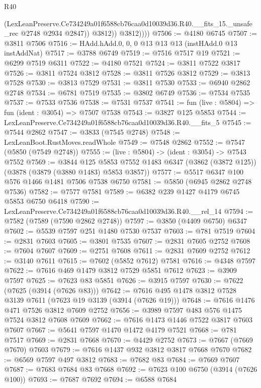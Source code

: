 \begin{lexlean}{R40}
\begin{coremodule}
                  (LexLeanPreserve.Ce734249a01f6588cb76caa0d10039d36.R40.__fits_15._unsafe_rec
                    @2748
                    @2934
                    @2847))
                @3812))
            @3812))))
@7506 := @4180 @6745
@7507 := @3811 @7506
@7516 := HAdd.hAdd.{0, 0, 0} @13 @13 @13 (instHAdd.{0} @13 instAddNat)
@7517 := @3788 @6749
@7519 := @7516 @7517 @19
@7521 := @6299 @7519 @6311
@7522 := @4180 @7521
@7524 := @3811 @7522 @3817
@7526 := @3811 @7524 @3812
@7528 := @3811 @7526 @3812
@7529 := @3813 @7528
@7530 := @3813 @7529
@7531 := @3811 @7530
@7533 := @6940 @2862 @2748
@7534 := @6781 @7519
@7535 := @3802 @6749
@7536 := @7534 @7535
@7537 := @7533 @7536
@7538 := @7531 @7537
@7541 := fun (live : @5804) => fun (ident : @3054) => @7507 @7538
@7543 := @3827 @125 @5853
@7544 := LexLeanPreserve.Ce734249a01f6588cb76caa0d10039d36.R40.__fits_5
@7545 := @7544 @2862
@7547 := @3833 (@7545 @2748)
@7548 := LexLeanBoot.RustMoves.readWhole
@7549 := @7548 @2862
@7552 := @7547 (@5850 (@7549 @2748))
@7555 := (live : @5804) -> (ident : @3054) -> @7543 @7552
@7569 := @3844
    @125
    @5853
    @7552
    @1483
    @6347
    (@3862 (@3872 @125))
    (@3878 (@3879 (@3880 @1483) @5853 @3857))
@7577 := @5517 @6347 @100 @576 @1466 @1481 @7506 @7538 @6750
@7581 := @5850 (@6945 @2862 @2748 @7536)
@7582 := @7577 @7581
@7589 := @6382 @239 @1427 @4179 @6745 @5853 @6750 @6418
@7590 := LexLeanPreserve.Ce734249a01f6588cb76caa0d10039d36.R40.__rel_14
@7594 := @7582 (@7589 (@7590 @2862 @2748))
@7597 := @3850 (@4409 @6750) @6347
@7602 := @5539 @7597 @251 @1480 @7530 @7537
@7603 := @781 @7519
@7604 := @2831 @7603
@7605 := @3801 @7535
@7607 := @2831 @7605 @2752
@7608 := @7604 @7607
@7609 := @2751 @7608
@7611 := @2831 @7609 @2752
@7612 := @3140 @7611
@7615 := @7602 (@5852 @7612) @7581
@7616 := @4348 @7597
@7622 := @7616 @469 @1479 @3812 @7529 @5851 @7612
@7623 := @3909 @7597
@7625 := @7623 @83 @5851
@7626 := @3915 @7597
@7630 := @7622 (@7625 (@3914 (@7626 @83)))
@7642 := @7616 @495 @1478 @3812 @7528 @3139 @7611 (@7623 @19 @3139 (@3914 (@7626 @19)))
@7648 := @7616 @1476 @471 @7526 @3812 @7609 @2752
@7656 := @3989 @7597 @483 @576 @1475 @7524 @3812 @7608 @7609
@7662 := @7616 @1473 @1446 @7522 @3817 @7603 @7607
@7667 := @5641 @7597 @1470 @1472 @4179 @7521
@7668 := @781 @7517
@7669 := @2831 @7668
@7670 := @4429 @2752
@7673 := @7667 (@7669 @7670) @7603
@7679 := @7616 @1437 @932 @3812 @3817 @7668 @7670
@7682 := @6569 @7597 @497 @3812
@7683 := @7682 @83
@7684 := @7669 @7607
@7687 := @7683 @7684 @83 @7668
@7692 := @7623 @100 @6750 (@3914 (@7626 @100))
@7693 := @7687 @7692
@7694 := @6588 @7684

\end{coremodule}
\end{lexlean}
